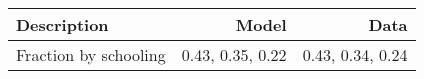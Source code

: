 \begin{tabular}{lrr}
\hline
Description & Model  & Data  \\ 
\hline
Fraction by schooling & 0.43, 0.35, 0.22  & 0.43, 0.34, 0.24  \\ 
\hline
\end{tabular}%
